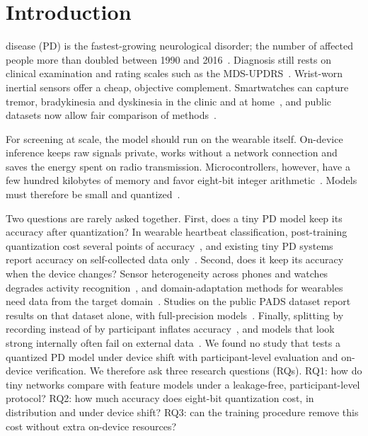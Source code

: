 \documentclass[journal,twoside,web]{ieeecolor}
\begin{document}
\section{Introduction}
 disease (PD) is the fastest-growing neurological disorder; the number of affected people more than doubled between 1990 and 2016~\cite{GBD2018PD,Dorsey2018}. Diagnosis still rests on clinical examination and rating scales such as the MDS-UPDRS~\cite{Goetz2008,Postuma2015}. Wrist-worn inertial sensors offer a cheap, objective complement. Smartwatches can capture tremor, bradykinesia and dyskinesia in the clinic and at home~\cite{Rovini2017,Sigcha2023rev,Powers2021,Lipsmeier2018}, and public datasets now allow fair comparison of methods~\cite{Varghese2024,Bot2016,Monipar2023}.

For screening at scale, the model should run on the wearable itself. On-device inference keeps raw signals private, works without a network connection and saves the energy spent on radio transmission. Microcontrollers, however, have a few hundred kilobytes of memory and favor eight-bit integer arithmetic~\cite{David2021,Lin2020,Banbury2021,Ray2022}. Models must therefore be small and quantized~\cite{Jacob2018,Krishnamoorthi2018,Nagel2021}.

Two questions are rarely asked together. First, does a tiny PD model keep its accuracy after quantization? In wearable heartbeat classification, post-training quantization cost several points of accuracy~\cite{Nikandish2026}, and existing tiny PD systems report accuracy on self-collected data only~\cite{Parikh2026}. Second, does it keep its accuracy when the device changes? Sensor heterogeneity across phones and watches degrades activity recognition~\cite{Stisen2015}, and domain-adaptation methods for wearables need data from the target domain~\cite{Zhu2025,Zheng2026}. Studies on the public PADS dataset report results on that dataset alone, with full-precision models~\cite{Varghese2024,Zannat2026}. Finally, splitting by recording instead of by participant inflates accuracy~\cite{Saeb2017,Kapoor2023}, and models that look strong internally often fail on external data~\cite{Zech2018,Kelly2019}. We found no study that tests a quantized PD model under device shift with participant-level evaluation and on-device verification. We therefore ask three research questions (RQs). RQ1: how do tiny networks compare with feature models under a leakage-free, participant-level protocol? RQ2: how much accuracy does eight-bit quantization cost, in distribution and under device shift? RQ3: can the training procedure remove this cost without extra on-device resources?
\end{document}
